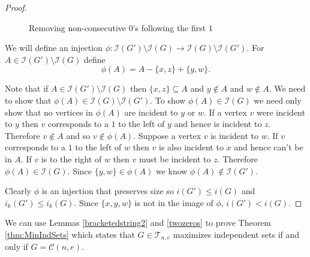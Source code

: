 \documentclass[12pt]{amsart}
\theoremstyle{plain}
\theoremstyle{definition}
\newcommand{\cI}{\mathcal{I}}
\newcommand{\cT}{\mathcal{T}}
\newcommand{\cC}{\mathcal{C}}
\begin{document}
\begin{proof}
\begin{figure}[!ht]
\begin{center}
\caption{Removing non-consecutive $0$'s following the first $1$}
\label{fig:Bracketed1String}
\end{center}
\end{figure}

We will define an injection $\phi: \cI(G')\setminus \cI(G)\to \cI(G)\setminus \cI(G')$.  For $A\in \cI(G')\setminus \cI(G)$ define
$$\phi(A) = 
A - \{x,z\} + \{y,w\}.$$

Note that if $A\in \cI(G')\setminus \cI(G)$ then $\{x,z\} \subseteq A$ and $y\notin A$ and $w\notin A$. 
We need to show that $\phi(A) \in \cI(G) \setminus \cI(G')$.  
To show $\phi(A)\in \cI(G)$ we need only show that no vertices in $\phi(A)$ are incident to $y$ or $w$.  
If a vertex $v$ were incident to $y$ then $v$ corresponds to a $1$ to the left of $y$ and hence is incident to $z$.  
Therefore $v\notin A$ and so $v\notin \phi(A)$.  Suppose a vertex $v$ is incident to $w$.  
If $v$ corresponds to a $1$ to the left of $w$ then $v$ is also incident to $x$ and hence can't be in $A$.  
If $v$ is to the right of $w$ then $v$ must be incident to $z$.  
Therefore $\phi(A) \in \cI(G)$.  Since $\{y,w\}\in \phi(A)$ we know $\phi(A) \notin \cI(G')$.  

Clearly  $\phi$ is an injection that preserves size so $i(G') \leq i(G)$ and $i_k(G') \leq i_k(G)$.  Since $\{x,y,w\}$ is not in the image of $\phi$, $i(G')<i(G)$.
\end{proof}

We can use  Lemmas \ref{bracketedstring2}  and \ref{twozeros} to prove Theorem \ref{thm:MinIndSets} which states that $G\in\cT_{n,e}$ maximizes independent sets if and only if $G = \cC(n,e)$.
\end{document}
